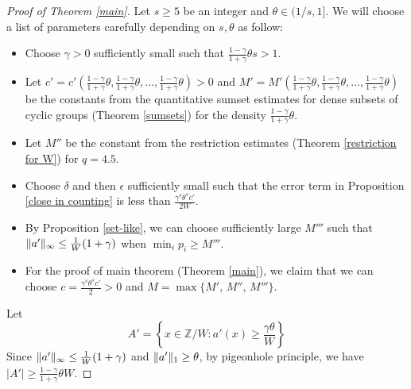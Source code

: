 \documentclass[11pt]{amsart}
\theoremstyle{plain} %
\theoremstyle{remark}
\numberwithin{equation}{section}
\newcommand{\Z}{\mathbb{Z}}
\DeclarePairedDelimiter\norm{\lVert}{\rVert}
\begin{document}
\begin{proof}[Proof of Theorem \ref{main}]
    Let $s\geq 5$ be an integer and $\theta\in(1/s,1]$. We will choose a list of parameters carefully depending on $s,\theta$ as follow:
    \begin{itemize}
        \item Choose $\gamma>0$ sufficiently small such that $\frac{1-\gamma}{1+\gamma}\theta s>1$.
        \item Let $c'=c'(\frac{1-\gamma}{1+\gamma}\theta,\frac{1-\gamma}{1+\gamma}\theta,...,\frac{1-\gamma}{1+\gamma}\theta)>0$ and $M'=M'(\frac{1-\gamma}{1+\gamma}\theta,\frac{1-\gamma}{1+\gamma}\theta,...,\frac{1-\gamma}{1+\gamma}\theta)$ be the constants from the quantitative sumset estimates for dense subsets of cyclic groups (Theorem \ref{sumsets}) for the density $\frac{1-\gamma}{1+\gamma}\theta$.
        \item Let $M''$ be the constant from the restriction estimates (Theorem \ref{restriction for W}) for $q=4.5$.
        \item Choose $\delta$ and then $\epsilon$ sufficiently small such that the error term in Proposition \ref{close in counting} is less than $\frac{\gamma^s\theta^s c'}{2W}$.
        \item By Proposition \ref{set-like}, we can choose sufficiently large $M'''$ such that $\norm{a'}_{\infty}\leq \frac{1}{W}(1+\gamma)$ when $\min_i p_i\geq M'''$.
        \item For the proof of main theorem (Theorem \ref{main}), we claim that we can choose $c=\frac{\gamma^s\theta^s c'}{2}>0$ and $M=\max\{M',\,M'',\,M'''\}$.
    \end{itemize}

    Let 
    \begin{equation*}
        A'=\left\{x\in\Z/W:a'(x)\geq\frac{\gamma\theta}{W}\right\}
    \end{equation*}
    Since $\norm{a'}_{\infty}\leq \frac{1}{W}(1+\gamma)$ and $\norm{a'}_1\geq \theta$, by pigeonhole principle, we have $|A'|\geq \frac{1-\gamma}{1+\gamma}\theta W$.


\end{proof}
\end{document}
